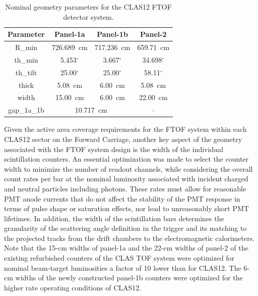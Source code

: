 \documentclass{elsart}
\begin{document}
\begin{table}[htbp]
\begin{center}
\begin{tabular} {c|c|c|c} \hline
Parameter & Panel-1a &  Panel-1b & Panel-2 \\ \hline
R\_min      & 726.689~cm & 717.236~cm & 659.71~cm \\ \hline
th\_min    & 5.453$^\circ$ & 3.667$^\circ$ & 34.698$^\circ$ \\ \hline
th\_tilt    & 25.00$^\circ$ & 25.00$^\circ$ & 58.11$^\circ$ \\ \hline
thick        & 5.08~cm           & 6.00~cm         & 5.08~cm \\ \hline
width       & 15.00~cm         & 6.00~cm         & 22.00~cm \\ \hline
gap\_1a\_1b & \multicolumn{2}{c|}{10.717~cm} &  -- \\ \hline
\end{tabular}
\caption{Nominal geometry parameters for the CLAS12 FTOF detector system.}
\label{geom-parms}
\end{center}
\end{table}

Given the active area coverage requirements for the FTOF system within each CLAS12 sector on the
Forward Carriage, another key aspect of the geometry associated with the FTOF system design is
the width of the individual scintillation counters. An essential optimization was made to select the
counter width to minimize the number of readout channels, while considering the overall count rates per
bar at the nominal luminosity associated with incident charged and neutral particles including photons.
These rates must allow for reasonable PMT anode currents that do not affect the stability of the PMT
response in terms of pulse shape or saturation effects, nor lead to unreasonably short PMT lifetimes.
In addition, the width of the scintillation bars determines the granularity of the scattering angle definition
in the trigger and its matching to the projected tracks from the drift chambers to the electromagnetic
calorimeters. Note that the 15-cm widths of panel-1a and the 22-cm widths of panel-2 of the existing
refurbished counters of the CLAS TOF system were optimized for nominal beam-target luminosities a
factor of 10 lower than for CLAS12. The 6-cm widths of the newly constructed panel-1b counters were
optimized for the higher rate operating conditions of CLAS12.
\end{document}
